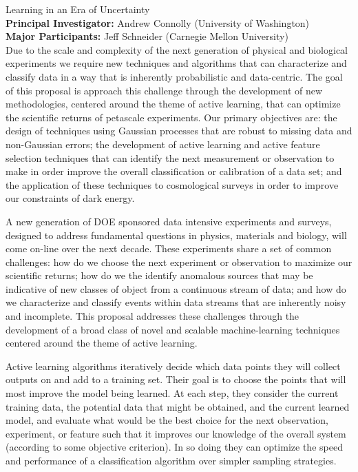 \documentclass[useAMS,usenatbib,tightenlines,11pt,preprint]{aastex}
\begin{document}
 

  Learning in an Era of Uncertainty \\
{\bf Principal Investigator: } Andrew Connolly (University of Washington)\\
{\bf Major Participants: }  Jeff Schneider (Carnegie Mellon University) \\

 Due to the scale and complexity of
the next generation of physical and biological experiments we require
new techniques and algorithms that can characterize and classify data
in a way that is inherently probabilistic and data-centric.  The goal
of this proposal is approach this challenge through the development of
new methodologies, centered around the theme of active learning, that
can optimize the scientific returns of petascale experiments. Our
primary objectives are: the design of techniques using Gaussian
processes that are robust to missing data and non-Gaussian errors; the
development of active learning and active feature selection techniques
that can identify the next measurement or observation to make in order 
improve the overall classification or calibration of a data set; and the application
of these techniques to cosmological surveys in order to improve our
constraints of dark energy.

 A new generation of DOE sponsored
data intensive experiments and surveys, designed to address
fundamental questions in physics, materials and biology, will come
on-line over the next decade. These experiments share a set of common
challenges: how do we choose the next experiment or observation to
maximize our scientific returns; how do we the identify anomalous
sources that may be indicative of new classes of object from a
continuous stream of data; and how do we characterize and classify
events within data streams that are inherently noisy and
incomplete. This proposal addresses these challenges through the
development of a broad class of novel and scalable machine-learning
techniques centered around the theme of active learning.

Active learning algorithms iteratively decide which data points they
will collect outputs on and add to a training set.  Their goal is to
choose the points that will most improve the model being learned.  At
each step, they consider the current training data, the potential data
that might be obtained, and the current learned model, and evaluate
what would be the best choice for the next observation, experiment, or
feature such that it improves our knowledge of the overall system
(according to some objective criterion).  In so doing they can
optimize the speed and performance of a classification algorithm over
simpler sampling strategies.
\end{document}
